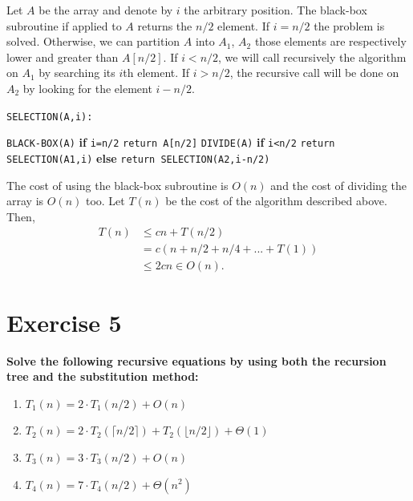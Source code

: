 \documentclass{article}
\begin{document}
	\noindent Let $A$ be the array and denote by $i$ the arbitrary position. The black-box subroutine if applied to $A$ returns the $n/2$ element. If $i=n/2$ the problem is solved. Otherwise, we can partition $A$ into $A_1$, $A_2$ those elements are respectively lower and greater than $A[n/2]$. If $i<n/2$, we will call recursively the algorithm on $A_1$ by searching its $i$th element. If $i>n/2$, the recursive call will be done on $A_2$ by looking for the element $i-n/2$.
	
		\begin{algorithm}
		\texttt{SELECTION(A,i):} 
		\begin{algorithmic}
			\State \texttt{BLACK-BOX(A)} 
			\State \textbf{if} \texttt{i=n/2} \texttt{return A[n/2]}
			\State \texttt{DIVIDE(A)}
			\State \textbf{if} \texttt{i<n/2} \texttt{return SELECTION(A1,i)}
			\State \textbf{else} \texttt{return SELECTION(A2,i-n/2)}
			
		\end{algorithmic}
	\end{algorithm}
	
	The cost of using the black-box subroutine is $O(n)$ and the cost of dividing the array is $O(n)$ too. Let $T(n)$ be the cost of the algorithm described above. Then,
	\begin{align}
	\nonumber
	T(n) & \leq cn + T(n/2) \\
	\nonumber
	& = c(n+n/2+n/4+...+T(1))\\
	\nonumber
	& \leq 2cn \in O(n). 
	\end{align}
	
	
	\section*{Exercise 5}
	\textbf{Solve the following recursive equations by using both the recursion tree and the substitution method:}
	\begin{enumerate}
		\item $T_1(n) = 2 \cdot T_1(n/2) + O(n)$
		\item $T_2(n) = 2 \cdot T_2 \left(  \lceil n/2 \rceil \right)  + T_2 \left( \lfloor n/2 \rfloor \right) + \Theta(1)$
		\item $T_3(n) = 3 \cdot T_3(n/2) + O(n)$
		\item $T_4(n) = 7 \cdot T_4(n/2) + \Theta(n^2)$
	\end{enumerate}
	
\end{document}
